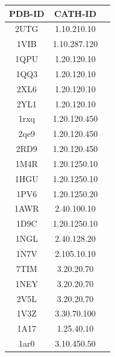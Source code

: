 \documentclass{report}
\begin{document}
\begin{tabular}{ | c || c | c | }

\hline
PDB-ID & CATH-ID  \\ \hline
2UTG & 1.10.210.10  \\ \hline %
1VIB & 1.10.287.120 \\ \hline %
1QPU & 1.20.120.10  \\ \hline %
1QQ3 & 1.20.120.10  \\ \hline %
2XL6 & 1.20.120.10  \\ \hline %
2YL1 & 1.20.120.10  \\ \hline%
1rxq & 1.20.120.450 \\ \hline%
2qe9 & 1.20.120.450 \\ \hline%
2RD9 & 1.20.120.450 \\ \hline%
1M4R & 1.20.1250.10 \\ \hline%
1HGU & 1.20.1250.10 \\ \hline%
1PV6 & 1.20.1250.20 \\ \hline%
1AWR & 2.40.100.10  \\ \hline%
1D9C & 1.20.1250.10 \\ \hline%
1NGL & 2.40.128.20  \\ \hline%
1N7V & 2.105.10.10  \\ \hline%
7TIM & 3.20.20.70   \\ \hline%
1NEY & 3.20.20.70   \\ \hline%
2V5L & 3.20.20.70   \\ \hline%
1V3Z & 3.30.70.100  \\ \hline%
1A17 & 1.25.40.10   \\ \hline%
1ar0 & 3.10.450.50  \\ \hline%

\end{tabular}
\end{document}
